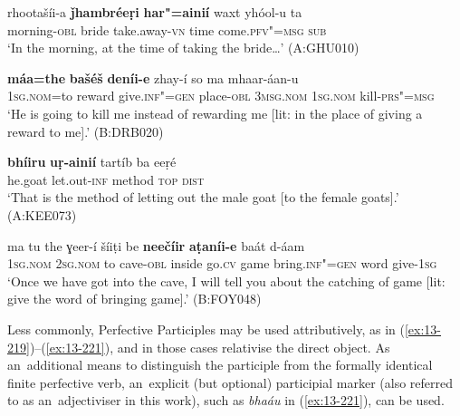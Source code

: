 \begin{exe}
\ex
\label{ex:13-215}
\gll rhootašíi-a \textbf{ǰhambréeṛi} \textbf{har"=ainií} waxt  yhóol-u ta \\
morning-\textsc{obl} bride take.away-\textsc{vn} time come.\textsc{pfv"=msg} \textsc{sub} \\
\glt `In the morning, at the time of taking the bride{\ldots}' (A:GHU010)

\ex
\label{ex:13-216}
\gll \textbf{máa=the} \textbf{bašéš} \textbf{deníi-e} zhay-í so  ma mhaar-áan-u\\
\textsc{1sg.nom}=to reward give.\textsc{inf"=gen} place-\textsc{obl} \textsc{3msg.nom} \textsc{1sg.nom} kill-\textsc{prs"=msg}\\
\glt `He is going to kill me instead of rewarding me [lit: in the place of giving a reward to me].' (B:DRB020)

\ex
\label{ex:13-217}
\gll \textbf{bhíiru} \textbf{uṛ-ainií} tartíb ba eeṛé\\
he.goat let.out-\textsc{inf} method \textsc{top} \textsc{dist} \\
\glt `That is the method of letting out the male goat [to the female goats].' (A:KEE073)

\ex
\label{ex:13-218}
\gll ma tu the ɣeer-í šíiṭi be \textbf{neečíir} \textbf{ aṭaníi-e} baát d-áam \\
\textsc{1sg.nom} \textsc{2sg.nom} to cave-\textsc{obl} inside go.\textsc{cv} game  bring.\textsc{inf"=gen} word give-\textsc{1sg} \\
\glt `Once we have got into the cave, I will tell you about the catching of game [lit: give the word of bringing game].' (B:FOY048) 
\end{exe}

Less commonly, Perfective Participles may be used attributively, as in (\ref{ex:13-219})--(\ref{ex:13-221}), and in those cases relativise the direct object. As an~additional means to distinguish the participle from the formally identical finite perfective verb, an~explicit (but optional) participial marker (also referred to as an~adjectiviser in this work), such as \textit{bhaáu} in (\ref{ex:13-221}), can be used.

